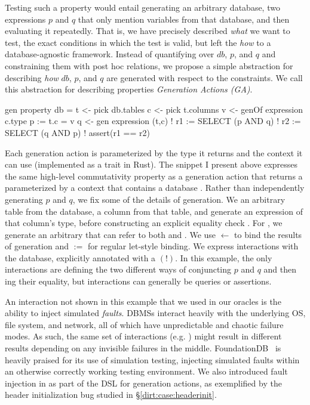 Testing such a property would entail generating an arbitrary database, two expressions
$p$ and $q$ that only mention variables from that database, and then evaluating it
repeatedly. That is, we have precisely described \emph{what} we want to test, the exact
conditions in which the test is valid, but left the \emph{how} to a database-agnostic
framework. Instead of quantifying over $\mathit{db}$, $p$, and $q$ and constraining
them with post hoc relations, we propose a simple abstraction for describing \emph{how}
$\mathit{db}$, $p$, and $q$ are generated with respect to the constraints. We call this
abstraction for describing
properties \emph{Generation Actions (GA)}.

\begin{gacode}
gen property db =
    t <- pick db.tables
    c <- pick t.columns
    v <- genOf expression c.type
    p := t.c = v
    q <- gen expression (t,c)
    ! r1 := SELECT (p AND q)
    ! r2 := SELECT (q AND p)
    ! assert(r1 == r2)
\end{gacode}

\noindent Each generation action is parameterized by the type it returns and the context it
can use (implemented as a trait in Rust). The snippet I present above expresses the same
high-level commutativity property as a generation action
that returns a  parameterized by a context that contains a database .
Rather than independently generating $p$ and $q$, we fix some of the details of generation.
We  an arbitrary table from the database,  a column from that table, and generate
an expression  of that column's type, before constructing an explicit equality
check . For , we generate an arbitrary  that can refer to
both  and . We use $\leftarrow$ to bind the results
of generation and $:=$ for regular let-style binding.
We express interactions with the database, explicitly annotated with a $(!)$. In this
example, the only interactions are defining the two different ways of conjuncting $p$
and $q$ and then ing their equality, but interactions can generally be
queries or assertions.

An interaction not shown in this example that we used in our oracles is the ability to
inject simulated {\em faults}. DBMSs interact heavily with the underlying OS, file
system, and network, all of which have unpredictable and chaotic failure modes. As
such, the same set of interactions (e.g. ) might result in
different results depending on any invisible failures in the middle.
FoundationDB~\cite{fdb} is heavily praised for its use of simulation testing, injecting
simulated faults within an otherwise correctly working testing environment. We also
introduced fault injection in \tool{} as part of the DSL for generation actions, as
exemplified by the header initialization bug studied in \S \ref{dirt:case:headerinit}.

